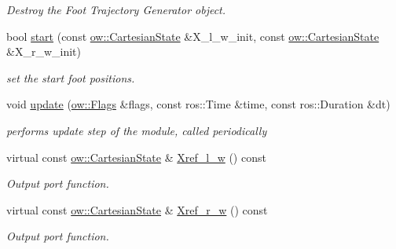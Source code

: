 \begin{DoxyCompactItemize}
\begin{DoxyCompactList}\small\item\em Destroy the Foot Trajectory Generator object. \end{DoxyCompactList}\item 
bool \hyperlink{classow__ftg_1_1FootTrajectoryGenerator_a49108bd9f7bd51d9c191fcf208175bfe}{start} (const \hyperlink{classow__core_1_1CartesianState}{ow\+::\+Cartesian\+State} \&X\+\_\+l\+\_\+w\+\_\+init, const \hyperlink{classow__core_1_1CartesianState}{ow\+::\+Cartesian\+State} \&X\+\_\+r\+\_\+w\+\_\+init)
\begin{DoxyCompactList}\small\item\em set the start foot positions. \end{DoxyCompactList}\item 
void \hyperlink{classow__ftg_1_1FootTrajectoryGenerator_a32fde0a35479c2bff2bb87dd23f8328a}{update} (\hyperlink{classow__core_1_1Flags}{ow\+::\+Flags} \&flags, const ros\+::\+Time \&time, const ros\+::\+Duration \&dt)
\begin{DoxyCompactList}\small\item\em performs update step of the module, called periodically \end{DoxyCompactList}\item 
virtual const \hyperlink{classow__core_1_1CartesianState}{ow\+::\+Cartesian\+State} \& \hyperlink{classow__ftg_1_1FootTrajectoryGenerator_a4a79aa3a932398f182c0719424d01369}{Xref\+\_\+l\+\_\+w} () const 
\begin{DoxyCompactList}\small\item\em Output port function. \end{DoxyCompactList}\item 
virtual const \hyperlink{classow__core_1_1CartesianState}{ow\+::\+Cartesian\+State} \& \hyperlink{classow__ftg_1_1FootTrajectoryGenerator_a809340f159fba526fdcc8610bd698585}{Xref\+\_\+r\+\_\+w} () const 
\begin{DoxyCompactList}\small\item\em Output port function. \end{DoxyCompactList}\end{DoxyCompactItemize}
